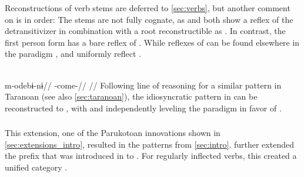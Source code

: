 

Reconstructions of verb stems are deferred to \cref{sec:verbs}, but another comment on  is in order:
The stems are not fully cognate, as \ikpeng and \bakairi both show a reflex of the \PPek detransitivizer  in combination with a root reconstructible as  .
In contrast, the \arara first person form has a bare reflex of .
While reflexes of  can be found elsewhere in the \arara paradigm , \ikpeng and \bakairi uniformly reflect .

\arara \parencite[][150]{alves2017arara}\\
\begingl
\gla m-odebɨ-nɨ//
\glb {}-come-//
\glft {}//
\endgl
\xe
%
Following  line of reasoning for a similar pattern in Taranoan (see also \cref{sec:taranoan}), the idiosyncratic pattern in \arara can be reconstructed to \PPek, with \bakairi and \ikpeng independently leveling the paradigm in favor of .




\subsubsection{\PWai {}}
\label{sec:waiwaian}
This extension, one of the Parukotoan innovations shown in \cref{sec:extensions_intro}, resulted in the \hixka patterns from \cref{sec:intro}.
\PWai further extended the  prefix  that was introduced in \PPar to .
For regularly inflected verbs, this created a unified  category .


